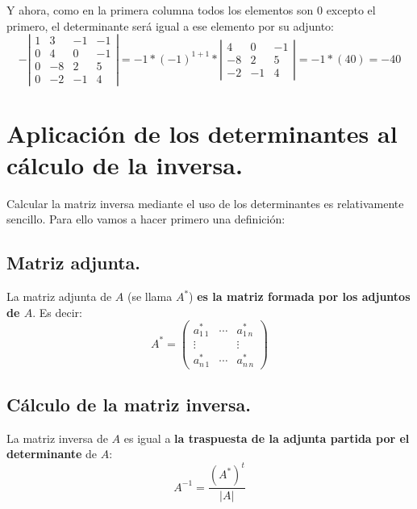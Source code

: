 \documentclass[a4paper,11pt,answers]{exam}
\newcommand\adjunto[1]{#1^\text{*}}
\begin{document}
\begin{solution}
Y ahora, como en la primera columna todos los elementos son 0 excepto el primero, el determinante será igual a ese elemento por su adjunto:
\[- \left| \begin{array}{rrrr}
	1&3&-1&-1\\
	0&4&0&-1\\
	0&-8&2&5\\
	0&-2&-1&4
\end{array}\right| =- 1 * (-1)^{1+1}*
\left| \begin{array}{rrr}
	4&0&-1\\
	-8&2&5\\
	-2&-1&4
\end{array}\right| = -1*(40) = -40\]
\end{solution}

\section{Aplicación de los determinantes al cálculo de la inversa.}
Calcular la matriz inversa mediante el uso de los determinantes es relativamente sencillo. Para ello vamos a hacer primero una definición:
\subsection{Matriz adjunta.}
La matriz adjunta de $A$ (se llama $\adjunto{A}$) \textbf{es la matriz formada por los adjuntos de $A$}. Es decir:
\[\adjunto{A} =\left( \begin{array}{rrr}
	\adjunto{a_{1\,1}}&\cdots&\adjunto{a_{1\,n}}\\
	\vdots&&\vdots\\
	\adjunto{a_{n\,1}}&\cdots&\adjunto{a_{n\,n}}
\end{array} \right)\]
\subsection{Cálculo de la matriz inversa.}
La matriz inversa de $A$ es igual a \textbf{la traspuesta de la adjunta partida por el determinante} de $A$:
\[A^{-1} = \frac{\left(\adjunto{A}\right)^t}{|A|}\]
\end{document}
